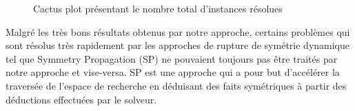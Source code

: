 \begin{figure}[!htbp]
 \centering
 \qquad
 \caption{Cactus plot  présentant le nombre total d'instances résolues}%
 \label{fig:frcactus}%
\end{figure}
Malgré les très bons résultats obtenus par notre approche, certains problèmes qui sont résolus très 
rapidement par les approches de rupture de symétrie dynamique tel que  Symmetry Propagation (SP) ne pouvaient toujours pas être traités par notre approche et vise-versa.
SP est une approche qui a pour but d'accélérer la traversée de l'espace de recherche en déduisant des faits symétriques à partir des déductions effectuées par le solveur.
